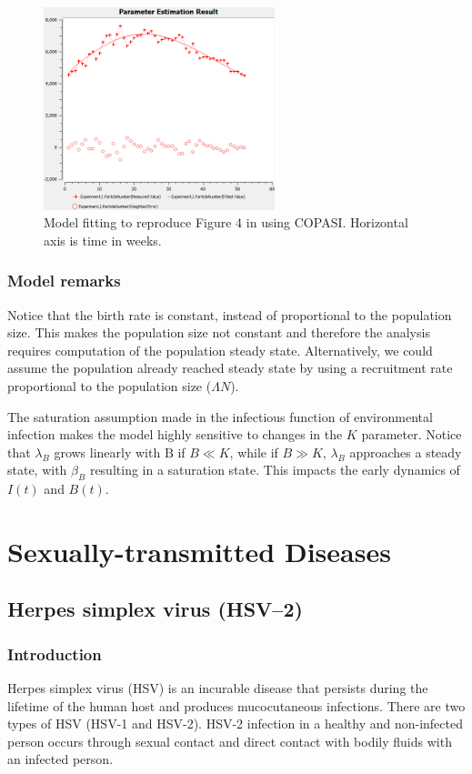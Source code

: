 \documentclass{book}
\begin{document}
%
\begin{figure}[ht]
    \centering
    \includegraphics[width = 0.6\textwidth]{ModelFit.png}
    \caption{Model fitting to reproduce Figure 4 in \cite{berhe2019parameter} using COPASI. Horizontal axis is time in weeks.}
    \label{fig:dysentrymodelfit}
\end{figure}
\subsection*{Model remarks}
Notice that the birth rate is constant, instead of proportional to the population size. This makes the population size not constant and therefore the analysis requires computation of the population steady state. Alternatively, we could assume the population already reached steady state by using a recruitment rate proportional to the population size ($\Lambda N$).

The saturation assumption made in the infectious function of environmental infection makes the model highly sensitive to changes in the $K$ parameter.
Notice that $\lambda_{B}$ grows linearly with $\mathrm{B}$ if $B \ll K$, while if $B \gg K$, $\lambda_{B}$ approaches a steady state, with $\beta_{B}$ resulting in a saturation state.
This impacts the early dynamics of $I(t)$ and $B(t)$.


\chapter{Sexually-transmitted Diseases}
\label{chapt:sextrans}

\section{Herpes simplex virus (HSV–2)}
\subsection*{Introduction}
Herpes simplex virus (HSV) is an incurable disease that persists during the lifetime of the human host and produces mucocutaneous infections. There are two types of HSV (HSV-1 and HSV-2). HSV-2 infection in a healthy and non-infected person occurs through sexual contact and direct contact with bodily fluids with an infected person.
\end{document}
